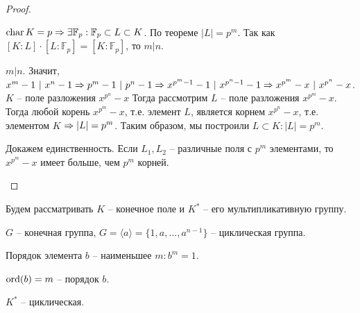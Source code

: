 \begin{proof}
	\begin{MyList}
		\item $\operatorname{char} K = p \Rightarrow \exists \mathbb{F}_p : \mathbb{F}_p \subset L \subset K$. По теореме $|L| = p^m$.
		Так как $[K:L] \cdot [L : \mathbb{F}_p] = [K : \mathbb{F}_p]$, то $m | n$. 

		\item $m | n$. Значит, $x^m - 1 \ | \ x^n - 1 \Rightarrow p^m - 1 \ | \ p^n - 1 \Rightarrow x^{p^m - 1} - 1 \ | \ x^{p^n - 1} - 1 \Rightarrow x^{p^m} - x \ | \ x^{p^n} - x$.
		$K$ -- поле разложения $x^{p^n} - x$ Тогда рассмотрим $L$ -- поле разложения $x^{p^m} - x$. Тогда любой корень $x^{p^m} - x$, т.е. элемент $L$, является корнем $x^{p^n} - x$, т.е. элементом $K$ $\Rightarrow |L| = p^m$. 
		Таким образом, мы построили $L \subset K : |L| = p^m$.
		
		Докажем единственность. Если $L_1, L_2$ -- различные поля с $p^m$ элементами, то $x^{p^m} - x$ имеет больше, чем $p^m$ корней.
	\end{MyList}
\end{proof}


Будем рассматривать $K$ -- конечное поле и $K^*$ -- его мультипликативную группу.

\begin{Def}
	$G$ -- конечная группа, $G = \langle a\rangle = \{1, a, ..., a^{n - 1}\}$ -- циклическая группа. 
\end{Def}

\begin{Def}
	Порядок элемента $b$ -- наименьшее $m : b^m = 1$.
\end{Def}

\begin{notation}
	$\operatorname{ord} (b) = m$ -- порядок $b$. 
\end{notation}

\begin{Thm}
	$K^*$ -- циклическая.
\end{Thm}

